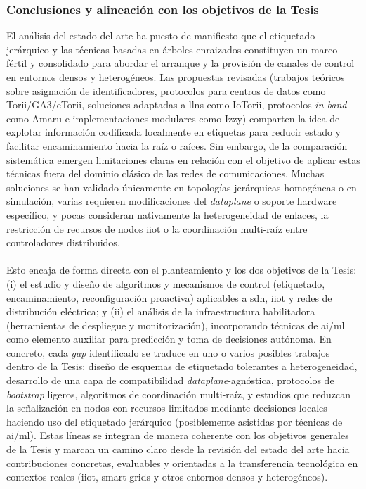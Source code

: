 \subsubsection{Conclusiones y alineación con los objetivos de la Tesis}
\label{subsubsec:conclu_etiquetado}
El análisis del estado del arte ha puesto de manifiesto que el etiquetado jerárquico y las técnicas basadas en árboles enraizados constituyen un marco fértil y consolidado para abordar el arranque y la provisión de canales de control en entornos densos y heterogéneos. Las propuestas revisadas (trabajos teóricos sobre asignación de identificadores, protocolos para centros de datos como Torii/GA3/eTorii, soluciones adaptadas a \gls{llns} como IoTorii, protocolos \textit{in-band} como Amaru e implementaciones modulares como Izzy) comparten la idea de explotar información codificada localmente en etiquetas para reducir estado y facilitar encaminamiento hacia la raíz o raíces. Sin embargo, de la comparación sistemática emergen limitaciones claras en relación con el objetivo de aplicar estas técnicas fuera del dominio clásico de las redes de comunicaciones. Muchas soluciones se han validado únicamente en topologías jerárquicas homogéneas o en simulación, varias requieren modificaciones del \textit{dataplane} o soporte hardware específico, y pocas consideran nativamente la heterogeneidad de enlaces, la restricción de recursos de nodos \gls{iiot} o la coordinación multi-raíz entre controladores distribuidos.\\
\\
Esto encaja de forma directa con el planteamiento y los dos objetivos de la Tesis: (i) el estudio y diseño de algoritmos y mecanismos de control (etiquetado, encaminamiento, reconfiguración proactiva) aplicables a \gls{sdn}, \gls{iiot} y redes de distribución eléctrica; y (ii) el análisis de la infraestructura habilitadora (herramientas de despliegue y monitorización), incorporando técnicas de \gls{ai}/\gls{ml} como elemento auxiliar para predicción y toma de decisiones autónoma. En concreto, cada \textit{gap} identificado se traduce en uno o varios posibles trabajos dentro de la Tesis: diseño de esquemas de etiquetado tolerantes a heterogeneidad, desarrollo de una capa de compatibilidad \textit{dataplane}-agnóstica, protocolos de \textit{bootstrap} ligeros, algoritmos de coordinación multi-raíz, y estudios que reduzcan la señalización en nodos con recursos limitados mediante decisiones locales haciendo uso del etiquetado jerárquico (posiblemente asistidas por técnicas de \gls{ai}/\gls{ml}). Estas líneas se integran de manera coherente con los objetivos generales de la Tesis y marcan un camino claro desde la revisión del estado del arte hacia contribuciones concretas, evaluables y orientadas a la transferencia tecnológica en contextos reales (\gls{iiot}, smart grids y otros entornos densos y heterogéneos).




